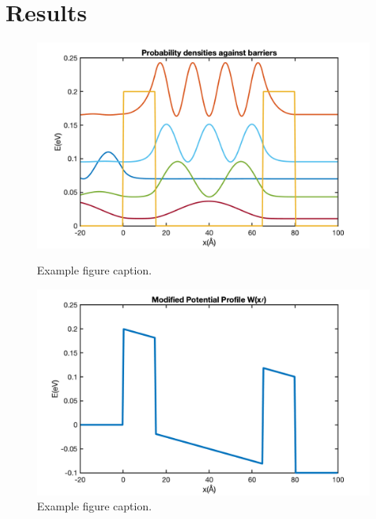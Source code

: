 \documentclass[twocolumn]{article}
\begin{document}
\section{Results}
\begin{figure}[h]
    \centering
    \includegraphics[width=0.8\linewidth]{prob_density.png}
    \caption{Example figure caption.}
    \label{fig:example-1}

    \centering
    \includegraphics[width=0.8\linewidth]{biased_junction.png}
    \caption{Example figure caption.}
    \label{fig:example-2}


\end{figure}
\end{document}
